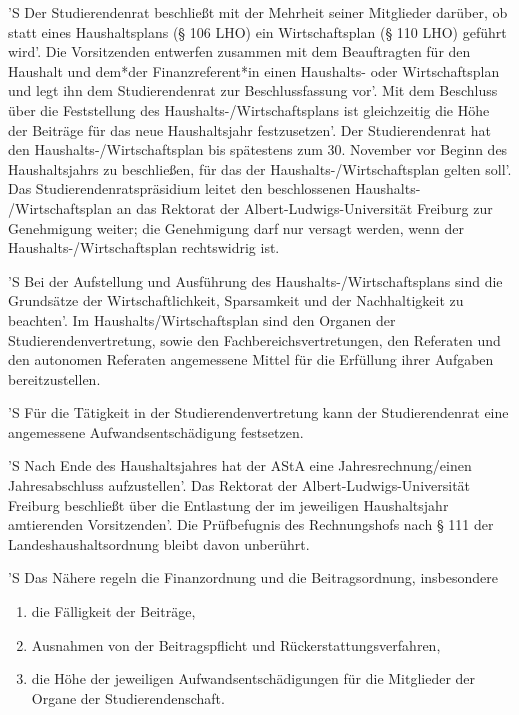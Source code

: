 \documentclass[fontsize=12pt,parskip=half]{scrartcl}
\begin{document}
\begin{contract}
  'S Der Studierendenrat beschließt mit der Mehrheit seiner Mitglieder darüber, ob
  statt eines Haushaltsplans (§ 106 LHO) ein Wirtschaftsplan (§ 110 LHO)
  geführt wird'. Die Vorsitzenden entwerfen zusammen mit dem Beauftragten für den
  Haushalt und dem*der Finanzreferent*in einen Haushalts- oder Wirtschaftsplan
  und legt ihn dem Studierendenrat zur Beschlussfassung vor'. Mit dem Beschluss
  über die Feststellung des Haushalts-/Wirtschaftsplans ist gleichzeitig   die
  Höhe der Beiträge für das neue Haushaltsjahr festzusetzen'. Der Studierendenrat
  hat den Haushalts-/Wirtschaftsplan bis spätestens zum 30. November vor Beginn
  des Haushaltsjahrs zu beschließen, für das der Haushalts-/Wirtschaftsplan
  gelten soll'. Das Studierendenratspräsidium leitet den beschlossenen Haushalts-
  /Wirtschaftsplan an das Rektorat der Albert-Ludwigs-Universität Freiburg zur
  Genehmigung weiter; die Genehmigung darf nur versagt werden, wenn der
  Haushalts-/Wirtschaftsplan rechtswidrig ist.

  'S Bei der Aufstellung und Ausführung des Haushalts-/Wirtschaftsplans sind die
  Grundsätze der Wirtschaftlichkeit, Sparsamkeit und der Nachhaltigkeit zu
  beachten'. Im Haushalts/Wirtschaftsplan sind den Organen der
  Studierendenvertretung, sowie den Fachbereichsvertretungen, den Referaten und
  den autonomen Referaten angemessene Mittel für die Erfüllung ihrer Aufgaben
  bereitzustellen.

  'S Für die Tätigkeit in der Studierendenvertretung kann der Studierendenrat eine
  angemessene Aufwandsentschädigung festsetzen.

  'S Nach Ende des Haushaltsjahres hat der AStA eine Jahresrechnung/einen
  Jahresabschluss aufzustellen'. Das Rektorat der Albert-Ludwigs-Universität
  Freiburg beschließt über die Entlastung der im jeweiligen Haushaltsjahr
  amtierenden Vorsitzenden'. Die Prüfbefugnis des Rechnungshofs nach § 111 der
  Landeshaushaltsordnung bleibt davon unberührt.

  'S Das Nähere regeln die Finanzordnung und die Beitragsordnung, insbesondere
  \begin{enumerate}[\qquad 1.]
  \item die Fälligkeit der Beiträge,
  \item Ausnahmen von der Beitragspflicht und Rückerstattungsverfahren,
  \item die Höhe der jeweiligen Aufwandsentschädigungen für die Mitglieder der
    Organe der Studierendenschaft.
  \end{enumerate}

\end{contract}
\end{document}
